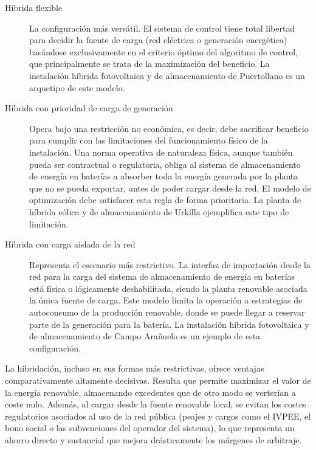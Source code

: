 \begin{description}

\item[Híbrida flexible] La configuración más versátil. El sistema de control tiene total libertad para decidir la fuente de carga (red eléctrica o generación energética) basándose exclusivamente en el criterio óptimo del algoritmo de control, que principalmente se trata de la maximización del beneficio. La instalación híbrida fotovoltaica y de almacenamiento de Puertollano es un arquetipo de este modelo.
          
\item[Híbrida con prioridad de carga de generación] Opera bajo una restricción no económica, es decir, debe sacrificar beneficio para cumplir con las limitaciones del funcionamiento físico de la instalación. Una norma operativa de naturaleza física, aunque también pueda ser contractual o regulatoria, obliga al sistema de almacenamiento de energía en baterías a absorber toda la energía generada por la planta que no se pueda exportar, antes de poder cargar desde la red. El modelo de optimización debe satisfacer esta regla de forma prioritaria. La planta de híbrida eólica y de almacenamiento de Urkilla ejemplifica este tipo de limitación.
          
\item[Híbrida con carga aislada de la red] Representa el escenario más restrictivo. La interfaz de importación desde la red para la carga del sistema de almacenamiento de energía en baterías está física o lógicamente deshabilitada, siendo la planta renovable asociada la única fuente de carga. Este modelo limita la operación a estrategias de autoconsumo de la producción renovable, donde se puede llegar a reservar parte de la generación para la batería. La instalación híbrida fotovoltaica y de almacenamiento de Campo Arañuelo es un ejemplo de esta configuración.

\end{description}

La hibridación, incluso en sus formas más restrictivas, ofrece ventajas comparativamente altamente decisivas. Resulta que permite maximizar el valor de la energía renovable, almacenando excedentes que de otro modo se verterían a coste nulo. Además, al cargar desde la fuente renovable local, se evitan los costes regulatorios asociados al uso de la red pública (peajes y cargos como el IVPEE, el bono social o las subvenciones del operador del sistema), lo que representa un ahorro directo y sustancial que mejora drásticamente los márgenes de arbitraje.

